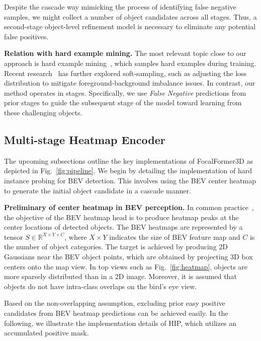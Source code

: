 \documentclass[10pt,twocolumn,letterpaper]{article}
\begin{document}
Despite the cascade way mimicking the process of identifying false negative samples, we might collect a number of object candidates across all stages. Thus, a second-stage object-level refinement model is necessary to eliminate any potential false positives.

\vspace{2mm}
\noindent\textbf{Relation with hard example mining.}
The most relevant topic close to our approach is hard example mining~\cite{exampleselection, ohem}, which samples hard examples during training. Recent research~\cite{focalloss, ghm, pisa} has further explored soft-sampling, such as adjusting the loss distribution to mitigate foreground-background imbalance issues. In contrast, our method operates in stages. Specifically, we use \textit{False Negative} predictions from prior stages to guide the subsequent stage of the model toward learning from these challenging objects. 




\subsection{Multi-stage Heatmap Encoder}
\label{sec:encoder}
The upcoming subsections outline the key implementations of FocalFormer3D as depicted in Fig.~\ref{fig:pipeline}. We begin by detailing the implementation of hard instance probing for BEV detection. This involves using the BEV center heatmap to generate the initial object candidate in a cascade manner.

\vspace{1mm}
\noindent\textbf{Preliminary of center heatmap in BEV perception.} 
In common practice~\cite{centerpoint, centernet, transfusion}, the objective of the BEV heatmap head is to produce heatmap peaks at the center locations of detected objects. The BEV heatmaps are represented by a tensor $S\in \mathbb{R}^{X\times Y\times C}$, where $X\times Y$ indicates the size of BEV feature map and $C$ is the number of object categories. The target is achieved by producing 2D Gaussians near the BEV object points, which are obtained by projecting 3D box centers onto the map view. In top views such as Fig.~\ref{fig:heatmap}, objects are more sparsely distributed than in a 2D image. Moreover, it is assumed that objects do not have intra-class overlaps on the bird's eye view.




Based on the non-overlapping assumption, excluding prior easy positive candidates from BEV heatmap predictions can be achieved easily. In the following, we illustrate the implementation details of HIP, which utilizes an accumulated positive mask.
\end{document}
